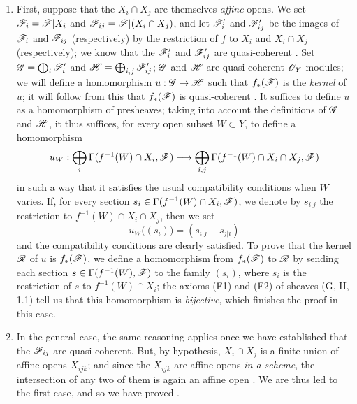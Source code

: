 \begin{enumerate}[label=(\alph*)]
  \item First, suppose that the $X_i\cap X_j$
        are themselves \emph{affine} opens. We set $\mathscr{F}_i=\mathscr{F}|X_i$ and
        $\mathscr{F}_{ij}=\mathscr{F}|(X_i\cap X_j)$, and let $\mathscr{F}'_i$ and
        $\mathscr{F}'_{ij}$ be the images of $\mathscr{F}_i$ and $\mathscr{F}_{ij}$
        (respectively) by the restriction of $f$ to $X_i$ and $X_i\cap X_j$
        (respectively); we know that the $\mathscr{F}'_i$ and $\mathscr{F}'_{ij}$ are
        quasi-coherent . Set $\mathscr{G}=\bigoplus_i\mathscr{F}'_i$ and
        $\mathscr{H}=\bigoplus_{i,j}\mathscr{F}'_{ij}$; $\mathscr{G}$ and $\mathscr{H}$ are
        quasi-coherent $\mathscr{O}_Y$-modules; we will define a homomorphism
        $u:\mathscr{G}\to\mathscr{H}$ such that $f_*(\mathscr{F})$ is the
        \emph{kernel} of $u$; it will follow from this that $f_*(\mathscr{F})$ is
        quasi-coherent . It suffices to define $u$ as
        a homomorphism of presheaves; taking into account the definitions of $\mathscr{G}$
        and $\mathscr{H}$, it thus suffices, for every open subset $W\subset Y$, to define a
        homomorphism
        \[
          u_W:\bigoplus_i\Gamma(f^{-1}(W)\cap X_i,\mathscr{F})
          \longrightarrow\bigoplus_{i,j}\Gamma(f^{-1}(W)\cap X_i\cap X_j,\mathscr{F})
        \]
        in such a way that it satisfies the usual compatibility conditions when $W$
        varies. If, for every section $s_i\in\Gamma(f^{-1}(W)\cap X_i,\mathscr{F})$, we
        denote by $s_{i|j}$ the restriction to $f^{-1}(W)\cap X_i\cap X_j$, then we set
        \[
          u_W\big((s_i)\big)=(s_{i|j}-s_{j|i})
        \]
        and the compatibility conditions are clearly satisfied. To prove that the kernel
        $\mathscr{R}$ of $u$ is $f_*(\mathscr{F})$, we define a homomorphism from $f_*(\mathscr{F})$ to
        $\mathscr{R}$ by sending each section $s\in\Gamma(f^{-1}(W),\mathscr{F})$ to the family
        $(s_i)$, where $s_i$ is the restriction of $s$ to $f^{-1}(W)\cap X_i$; the
        axioms (F1) and (F2) of sheaves (G, II, 1.1) tell us that this homomorphism is
        \emph{bijective}, which finishes the proof in this case.
  \item In the general case, the same reasoning applies once we have established that
        the $\mathscr{F}_{ij}$ are quasi-coherent. But, by hypothesis, $X_i\cap X_j$ is a
        finite union of affine opens $X_{ijk}$; and since the $X_{ijk}$ are affine opens
        \emph{in a scheme}, the intersection of any two of them is again an affine open
        . We are thus led to the first case, and so we have proved
        .
\end{enumerate}

